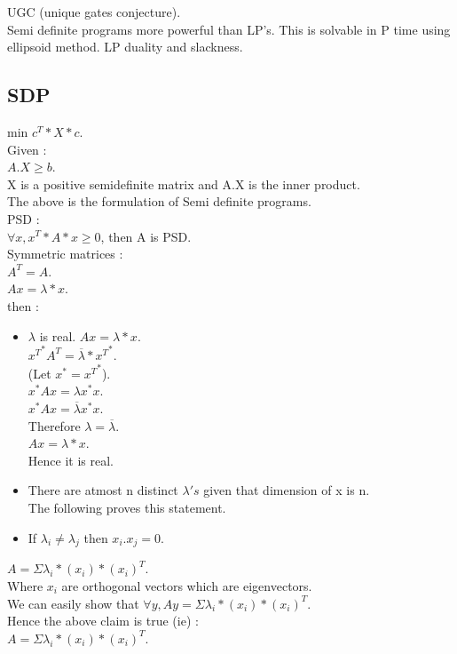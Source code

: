 \documentclass[solution,addpoints,12pt]{exam}
\begin{document}
UGC (unique gates conjecture).\\
Semi definite programs more powerful than LP's.
This is solvable in P time using ellipsoid method.
LP duality and slackness.\\
\subsection{SDP}
min $c^T*X*c$.\\
Given :\\
$A.X \ge b$.\\
X is a positive semidefinite matrix and A.X is the inner product.\\
The above is the formulation of  Semi definite programs.\\


PSD :\\
$\forall x, x^T*A*x \ge 0$, then A is PSD.\\
Symmetric matrices :\\
$A^T = A$.\\
$Ax = \lambda*x$.\\
then :
\begin{itemize}
\item $\lambda$ is real.
$Ax = \lambda*x$.\\
${x^T}^* A^T = \overline{\lambda}*{x^T}^*$.\\
(Let $x^* = {x^T}^*$).\\
$x^* A x = \lambda x^* x$.\\
$x^* A x = \overline{\lambda} x^* x$.\\
Therefore $\lambda = \overline{\lambda}$.\\$Ax = \lambda*x$.\\
Hence it is real.\\
\item There are atmost n distinct $\lambda's$ given that dimension of x is n.\\
The following proves this statement.
\item If $\lambda_i \ne \lambda_j$ then $x_i.x_j = 0$.
\end{itemize}

$A = \Sigma \lambda_i*(x_i)*{(x_i)}^T$.\\
Where $x_i$ are orthogonal vectors which are eigenvectors.\\
We can easily show that
$\forall y, Ay = \Sigma \lambda_i*(x_i)*{(x_i)}^T$.\\
Hence the above claim is true (ie) :\\
$A = \Sigma \lambda_i*(x_i)*{(x_i)}^T$.\\
\end{document}
